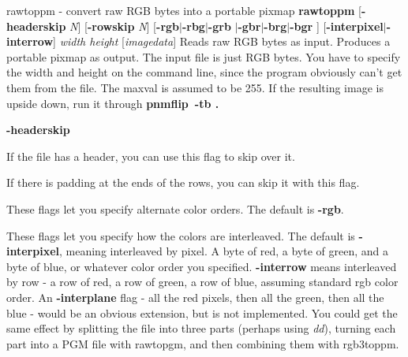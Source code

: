 %

\newpage
%

rawtoppm - convert raw RGB bytes into a portable pixmap
{\bf rawtoppm}
{\rm [}{\bf -headerskip}
{\it N}{\rm ]}
{\rm [}{\bf -rowskip}
{\it N}{\rm ]}
{\rm [}{\bf -rgb}{\rm $|$}{\bf -rbg}{\rm $|$}{\bf -grb}
{\rm $|$}{\bf -gbr}{\rm $|$}{\bf -brg}{\rm $|$}{\bf -bgr}
{\rm ]}
{\rm [}{\bf -interpixel}{\rm $|$}{\bf -interrow}{\rm ]}
{\it width height}
{\rm [}{\it imagedata}{\rm ]}
Reads raw RGB bytes as input.
Produces a portable pixmap as output.
The input file is just RGB bytes.
You have to specify the width and height on the command line,
since the program obviously can't get them from the file.
The maxval is assumed to be 255.
If the resulting image is upside down, run it through
{\bf pnmflip\ -tb .}
\begin{TPlist}{{\bf -headerskip}}
\item[{{\bf -headerskip}}]
If the file has a header, you can use this flag to
skip over it.
\item[{{\bf -rowskip}}]
If there is padding at the ends of the rows, you can skip it with this flag.
\item[{{\bf -rgb -rbg -grb -gbr -brg -bgr}}]
These flags let you specify alternate color orders.  The default is
{\bf -rgb}{\rm .}
\item[{{\bf -interpixel -interrow}}]
These flags let you specify how the colors are interleaved.
The default is
{\bf -interpixel}{\rm ,}
meaning interleaved by pixel.
A byte of red, a byte of green, and a byte
of blue, or whatever color order you specified.
{\bf -interrow}
means interleaved by row - a row of red, a row of green, a row of blue,
assuming standard rgb color order.
An
{\bf -interplane}
flag  - all the red pixels, then all the green, then all the blue - would
be an obvious extension, but is not implemented.
You could get the same effect by splitting the file into three parts
(perhaps using
{\it dd}{\rm ),}
turning each part into a PGM file with rawtopgm, and then combining them
with rgb3toppm.
\end{TPlist}

